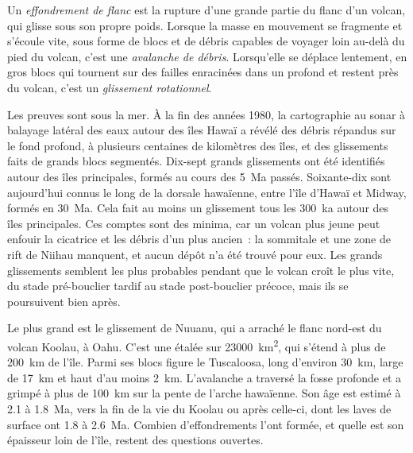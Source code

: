 \begin{definition}\label{def:b2:oceanic-islands:collapse}
Un \emph{effondrement de flanc} est la rupture d'une grande partie du flanc
d'un volcan, qui glisse sous son propre poids. Lorsque la masse en mouvement se fragmente et s'écoule
vite, sous forme de blocs et de débris capables de voyager loin au-delà du pied du volcan, c'est une
\emph{avalanche de débris}. Lorsqu'elle se déplace lentement, en gros blocs qui tournent sur
des failles enracinées dans un  profond et restent près du volcan, c'est un \emph{glissement rotationnel}.
\end{definition}

Les preuves sont sous la mer. À la fin des années 1980, la cartographie au sonar à balayage latéral
des eaux autour des îles Hawaï a révélé des débris répandus sur le fond profond, à plusieurs centaines
de kilomètres des îles, et des glissements faits de grands blocs segmentés. Dix-sept grands glissements
ont été identifiés autour des îles principales, formés au cours des \qty{5}{Ma} passés. Soixante-dix
sont aujourd'hui connus le long de la dorsale hawaïenne, entre l'île d'Hawaï et Midway, formés
en \qty{30}{Ma}. Cela fait au moins un glissement tous les \qty{300}{ka} autour des îles principales.
Ces comptes sont des minima, car un volcan plus jeune peut enfouir la cicatrice et les débris
d'un plus ancien~: la  sommitale et une zone de rift de Niihau manquent, et aucun dépôt n'a été
trouvé pour eux. Les grands glissements semblent les plus probables pendant que le volcan croît le plus
vite, du stade pré-bouclier tardif au stade post-bouclier précoce, mais ils se poursuivent bien après.

Le plus grand est le glissement de Nuuanu, qui a arraché le flanc nord-est du volcan
Koolau, à Oahu. C'est une  étalée sur \qty{23000}{km^2}, qui s'étend à
plus de \qty{200}{km} de l'île. Parmi ses blocs figure le  Tuscaloosa, long
d'environ \qty{30}{km}, large de \qty{17}{km} et haut d'au moins \qty{2}{km}. L'avalanche
a traversé la fosse profonde et a grimpé à plus de \qty{100}{km} sur la pente de l'arche
hawaïenne. Son âge est estimé à 2.1 à \qty{1.8}{Ma}, vers la fin de la vie du Koolau ou
après celle-ci, dont les laves de surface ont 1.8 à \qty{2.6}{Ma}. Combien d'effondrements
l'ont formée, et quelle est son épaisseur loin de l'île, restent des questions ouvertes.

